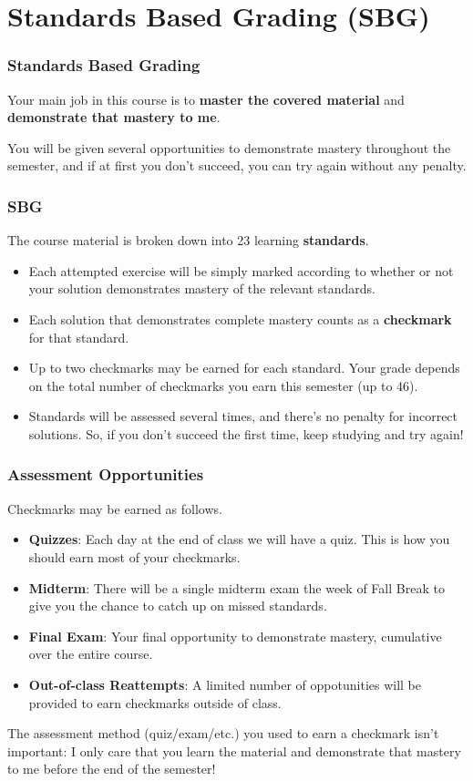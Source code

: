\documentclass{beamer}
\begin{document}
\section{Standards Based Grading (SBG)}
\begin{frame}\frametitle{Standards Based Grading}
Your main job in this course is to \textbf{master the covered material}
and \textbf{demonstrate that mastery to me}.

\vspace{0.2in}
\pause

You will be given several opportunities to demonstrate mastery throughout
the semester, and if
at first you don't succeed, you can try again without any penalty.
\end{frame}

\begin{frame}\frametitle{SBG}
The course material is broken down into 23 learning \textbf{standards}.
\begin{itemize}
\item Each attempted exercise will be simply marked according to whether or not
      your solution demonstrates mastery of the relevant standards.
\item Each solution that demonstrates complete mastery counts as a
      \textbf{checkmark} for that standard.
\item Up to two checkmarks may be earned for each standard. Your grade depends
      on the total number of checkmarks you earn this semester (up to 46).
\item Standards will be assessed several times, and there's no penalty for
      incorrect solutions. So, if you don't succeed the first time,
      keep studying and try again!
\end{itemize}
\end{frame}

\begin{frame}\frametitle{Assessment Opportunities}
Checkmarks may be earned as follows.
\begin{itemize}
\item {\bf Quizzes}: Each day at the end of class we will have a quiz. This
      is how you should earn most of your checkmarks.
\item {\bf Midterm}: There will be a single midterm exam the week of Fall Break
      to give you the chance to catch up on missed standards.
\item {\bf Final Exam}: Your final opportunity to demonstrate mastery,
      cumulative over the entire course.
\item {\bf Out-of-class Reattempts}: A limited number of oppotunities
      will be provided to earn checkmarks outside of class.
\end{itemize}

\pause

\vspace{0.2in}

The assessment method (quiz/exam/etc.) you used to earn a checkmark
isn't important: I only care that you
learn the material and demonstrate that mastery to me before the end of the
semester!
\end{frame}
\end{document}
